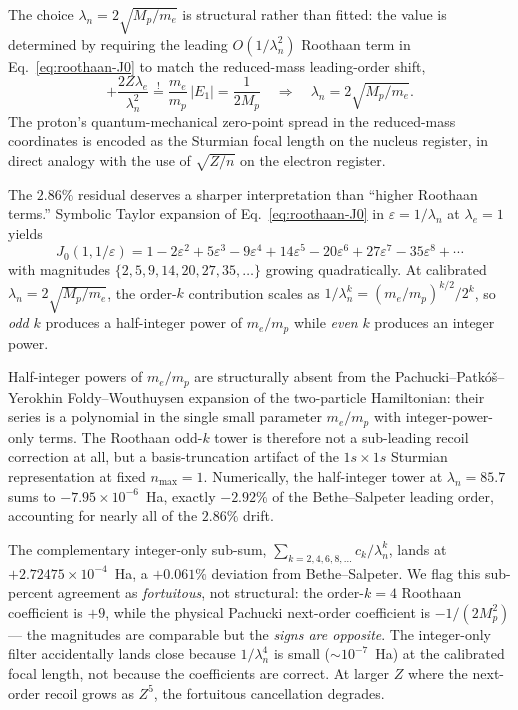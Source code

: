\documentclass[twocolumn,prc,amsmath,amssymb,superscriptaddress]{revtex4-2}
\begin{document}
The choice $\lambda_n = 2\sqrt{M_p/m_e}$ is structural rather than
fitted: the value is determined by requiring the leading
$O(1/\lambda_n^2)$ Roothaan term in Eq.~\eqref{eq:roothaan-J0} to match
the reduced-mass leading-order shift,
\[
  +\frac{2 Z \lambda_e}{\lambda_n^2}
  \stackrel{!}{=} \frac{m_e}{m_p}\, |E_1|
  = \frac{1}{2 M_p}\quad
  \Longrightarrow\quad
  \lambda_n = 2\sqrt{M_p / m_e}.
\]
The proton's quantum-mechanical zero-point spread in the reduced-mass
coordinates is encoded as the Sturmian focal length on the nucleus
register, in direct analogy with the use of $\sqrt{Z/n}$ on the electron
register.

The $2.86\%$ residual deserves a sharper interpretation than ``higher
Roothaan terms.'' Symbolic Taylor expansion of Eq.~\eqref{eq:roothaan-J0}
in $\varepsilon = 1/\lambda_n$ at $\lambda_e = 1$ yields
\begin{equation}
  J_0(1, 1/\varepsilon)
  = 1 - 2\varepsilon^2 + 5\varepsilon^3 - 9\varepsilon^4
    + 14\varepsilon^5 - 20\varepsilon^6 + 27\varepsilon^7
    - 35\varepsilon^8 + \cdots
\label{eq:roothaan-taylor}
\end{equation}
with magnitudes $\{2, 5, 9, 14, 20, 27, 35, \ldots\}$ growing
quadratically. At calibrated $\lambda_n = 2\sqrt{M_p / m_e}$, the
order-$k$ contribution scales as $1/\lambda_n^k = (m_e/m_p)^{k/2}/2^k$,
so \emph{odd} $k$ produces a half-integer power of $m_e/m_p$ while
\emph{even} $k$ produces an integer power.

Half-integer powers of $m_e/m_p$ are structurally absent from the
Pachucki--Patkó\v{s}--Yerokhin Foldy--Wouthuysen expansion of the
two-particle Hamiltonian: their series is a polynomial in the single
small parameter $m_e/m_p$ with integer-power-only terms. The Roothaan
odd-$k$ tower is therefore not a sub-leading recoil correction at all,
but a basis-truncation artifact of the $1s \times 1s$ Sturmian
representation at fixed $n_{\max} = 1$. Numerically, the half-integer
tower at $\lambda_n = 85.7$ sums to $-7.95 \times 10^{-6}$~Ha,
exactly $-2.92\%$ of the Bethe--Salpeter leading order, accounting
for nearly all of the $2.86\%$ drift.

The complementary integer-only sub-sum,
$\sum_{k = 2,4,6,8,\ldots} c_k / \lambda_n^k$, lands at
$+2.72475 \times 10^{-4}$~Ha, a $+0.061\%$ deviation from
Bethe--Salpeter. We flag this sub-percent agreement as
\emph{fortuitous}, not structural: the order-$k=4$ Roothaan
coefficient is $+9$, while the physical Pachucki next-order
coefficient is $-1/(2 M_p^2)$ --- the magnitudes are comparable but
the \emph{signs are opposite}. The integer-only filter accidentally
lands close because $1/\lambda_n^4$ is small ($\sim 10^{-7}$~Ha) at
the calibrated focal length, not because the coefficients are
correct. At larger $Z$ where the next-order recoil grows as $Z^5$,
the fortuitous cancellation degrades.
\end{document}

